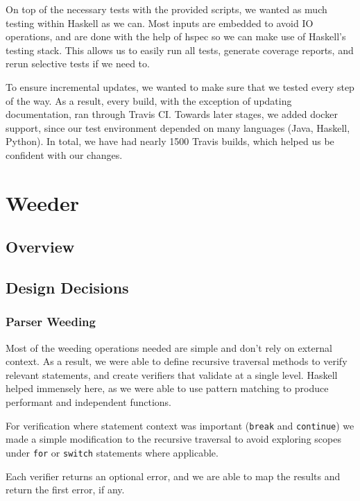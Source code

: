 \documentclass[11pt]{article}
\begin{document}
On top of the necessary tests with the provided scripts, we wanted as much
testing within Haskell as we can. Most inputs are embedded to avoid IO operations, and are done with the help of hspec so we can make use of Haskell's testing stack. This allows us to easily run all tests,
generate coverage reports, and rerun selective tests if we need to.

To ensure incremental updates, we wanted to make sure that we tested every step of the way. As a result, every build, with the exception of updating documentation, ran through Travis CI.
Towards later stages, we added docker support, since our test environment depended on many languages (Java, Haskell, Python).
In total, we have had nearly 1500 Travis builds, which helped us be confident with our changes.

\section{Weeder}
\subsection{Overview} %
\subsection{Design Decisions}
\subsubsection{Parser Weeding}
Most of the weeding operations needed are simple and don't rely on
external context. As a result, we were able to define recursive
traversal methods to verify relevant statements, and create verifiers
that validate at a single level. Haskell helped immensely here, as we
were able to use pattern matching to produce performant and
independent functions.

For verification where statement context was important (\texttt{break}
and \texttt{continue}) we made a simple modification to the recursive
traversal to avoid exploring scopes under \texttt{for} or
\texttt{switch} statements where applicable.

Each verifier returns an optional error, and we are able to map the
results and return the first error, if any.
\end{document}
